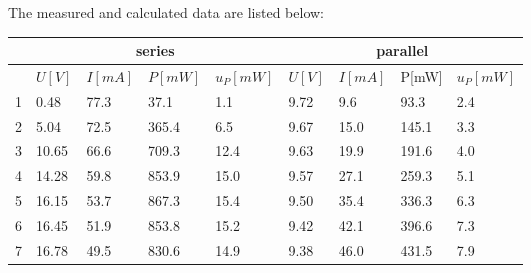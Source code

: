 \documentclass[12pt, a4paper]{article}
\begin{document}
The measured and calculated data are listed below:
\begin{table}[H]
	\begin{center}
	\begin{tabular}{|l|llll|llll|}
	\hline
	   & \multicolumn{4}{c|}{series}                                                                           & \multicolumn{4}{c|}{parallel}                                                                           \\ \hline
	   & \multicolumn{1}{l|}{$U[V]$} & \multicolumn{1}{l|}{$I[mA]$} & \multicolumn{1}{l|}{$P[mW]$} & $u_P[mW]$ & \multicolumn{1}{l|}{$U[V]$} & \multicolumn{1}{l|}{$I[mA]$} & \multicolumn{1}{l|}{P{[}mW{]}} & $u_P[mW]$ \\ \hline
	1  & \multicolumn{1}{l|}{0.48}   & \multicolumn{1}{l|}{77.3}    & \multicolumn{1}{l|}{37.1}    & 1.1       & \multicolumn{1}{l|}{9.72}   & \multicolumn{1}{l|}{9.6}     & \multicolumn{1}{l|}{93.3}      & 2.4       \\ \hline
	2  & \multicolumn{1}{l|}{5.04}   & \multicolumn{1}{l|}{72.5}    & \multicolumn{1}{l|}{365.4}   & 6.5       & \multicolumn{1}{l|}{9.67}   & \multicolumn{1}{l|}{15.0}    & \multicolumn{1}{l|}{145.1}     & 3.3       \\ \hline
	3  & \multicolumn{1}{l|}{10.65}  & \multicolumn{1}{l|}{66.6}    & \multicolumn{1}{l|}{709.3}   & 12.4      & \multicolumn{1}{l|}{9.63}   & \multicolumn{1}{l|}{19.9}    & \multicolumn{1}{l|}{191.6}     & 4.0       \\ \hline
	4  & \multicolumn{1}{l|}{14.28}  & \multicolumn{1}{l|}{59.8}    & \multicolumn{1}{l|}{853.9}   & 15.0      & \multicolumn{1}{l|}{9.57}   & \multicolumn{1}{l|}{27.1}    & \multicolumn{1}{l|}{259.3}     & 5.1       \\ \hline
	5  & \multicolumn{1}{l|}{16.15}  & \multicolumn{1}{l|}{53.7}    & \multicolumn{1}{l|}{867.3}   & 15.4      & \multicolumn{1}{l|}{9.50}   & \multicolumn{1}{l|}{35.4}    & \multicolumn{1}{l|}{336.3}     & 6.3       \\ \hline
	6  & \multicolumn{1}{l|}{16.45}  & \multicolumn{1}{l|}{51.9}    & \multicolumn{1}{l|}{853.8}   & 15.2      & \multicolumn{1}{l|}{9.42}   & \multicolumn{1}{l|}{42.1}    & \multicolumn{1}{l|}{396.6}     & 7.3       \\ \hline
	7  & \multicolumn{1}{l|}{16.78}  & \multicolumn{1}{l|}{49.5}    & \multicolumn{1}{l|}{830.6}   & 14.9      & \multicolumn{1}{l|}{9.38}   & \multicolumn{1}{l|}{46.0}    & \multicolumn{1}{l|}{431.5}     & 7.9       \\ \hline

\end{tabular}
\end{center}
\end{table}
\end{document}
